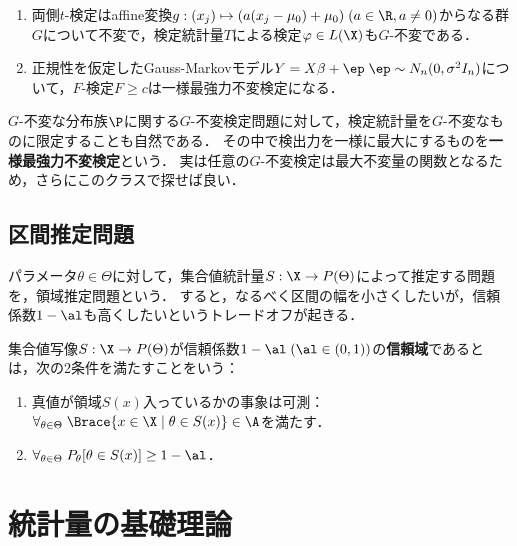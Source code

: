 \documentclass[uplatex,dvipdfmx]{jsreport}
\begin{document}
\begin{example}\mbox{}\label{exp-invariant-test}
    \begin{enumerate}
        \item 両側$t$-検定はaffine変換$g:(x_j)\mapsto(a(x_j-\mu_0)+\mu_0)\;(a\in\R,a\ne0)$からなる群$G$について不変で，検定統計量$T$による検定$\varphi\in L(\X)$も$G$-不変である．
        \item 正規性を仮定したGauss-Markovモデル$Y=X\beta+\ep\;\ep\sim N_n(0,\sigma^2I_n)$について，$F$-検定$F\ge c$は一様最強力不変検定になる．
    \end{enumerate}
\end{example}

\begin{definition}[UMP不変検定]
    $G$-不変な分布族$\P$に関する$G$-不変検定問題に対して，検定統計量を$G$-不変なものに限定することも自然である．
    その中で検出力を一様に最大にするものを\textbf{一様最強力不変検定}という．
    実は任意の$G$-不変検定は最大不変量の関数となるため，さらにこのクラスで探せば良い．
\end{definition}

\subsection{区間推定問題}

\begin{tcolorbox}[colframe=ForestGreen, colback=ForestGreen!10!white,breakable,colbacktitle=ForestGreen!40!white,coltitle=black,fonttitle=\bfseries\sffamily,
title=]
    パラメータ$\theta\in\Theta$に対して，集合値統計量$S:\X\to P(\Theta)$によって推定する問題を，領域推定問題という．
    すると，なるべく区間の幅を小さくしたいが，信頼係数$1-\al$も高くしたいというトレードオフが起きる．
\end{tcolorbox}

\begin{model}
    集合値写像$S:\X\to P(\Theta)$が信頼係数$1-\al\;(\al\in(0,1))$の\textbf{信頼域}であるとは，次の2条件を満たすことをいう：
    \begin{enumerate}
        \item 真値が領域$S(x)$入っているかの事象は可測：$\forall_{\theta\in\Theta}\;\Brace{x\in\X\mid\theta\in S(x)}\in\A$を満たす．
        \item $\forall_{\theta\in\Theta}\;P_\theta[\theta\in S(x)]\ge1-\al$．
    \end{enumerate}
\end{model}

\section{統計量の基礎理論}
\end{document}
